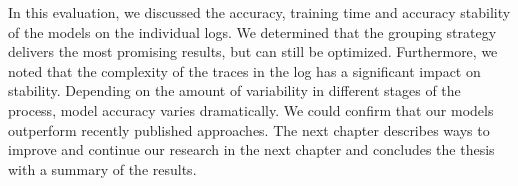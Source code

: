 In this evaluation, we discussed the accuracy, training time and accuracy stability of the models on the individual logs.
We determined that the grouping strategy delivers the most promising results, but can still be optimized.
Furthermore, we noted that the complexity of the traces in the log has a significant impact on stability.
Depending on the amount of variability in different stages of the process, model accuracy varies dramatically.
We could confirm that our models outperform recently published approaches.
The next chapter describes ways to improve and continue our research in the next chapter and concludes the thesis with a summary of the results.
